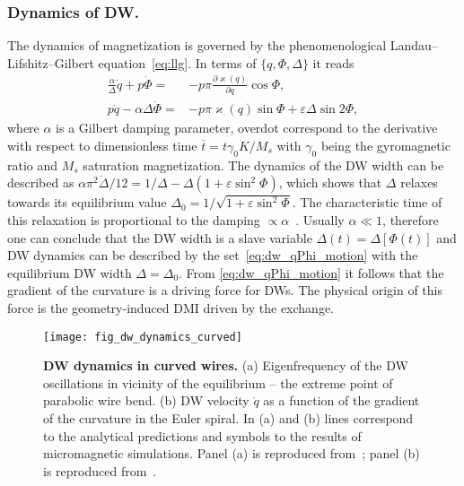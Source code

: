 \subsubsection*{Dynamics of DW.} The dynamics of magnetization is governed by the phenomenological Landau--Lifshitz--Gilbert equation~\eqref{eq:llg}. In terms of $\{q,\Phi,\Delta\}$ it reads~\cite{Yershov15b,Yershov18a}
\begin{equation}\label{eq:dw_qPhi_motion}
\begin{split}
\frac{\alpha}{\Delta}\dot{q}+p\dot{\Phi} = &-p\pi\frac{\partial\varkappa(q)}{\partial q}\cos\Phi,\\
p\dot{q}-\alpha\Delta\dot{\Phi} = &-p\pi\varkappa(q)\sin\Phi+\varepsilon\Delta\sin 2\Phi,
\end{split}
\end{equation}
where $\alpha$ is a Gilbert damping parameter, overdot correspond to the derivative with respect to dimensionless time $\overline{t}=t\gamma_0K/M_s$ with $\gamma_0$ being the gyromagnetic ratio and $M_s$ saturation magnetization.
The dynamics of the DW width can be described as $\alpha\pi^2\dot{\Delta}/12=1/\Delta-\Delta\left(1+\varepsilon\sin^2\Phi\right)$, which shows that $\Delta$ relaxes towards its equilibrium value $\Delta_0=1/\sqrt{1+\varepsilon\sin^2\Phi}$. The characteristic time of this relaxation is proportional to the damping $\propto \alpha$~\cite{Hillebrands06}. Usually $\alpha\ll1$, therefore one can conclude that the DW width is a slave variable $\Delta(t) = \Delta[\Phi(t)]$ and DW dynamics can be described by the set~\eqref{eq:dw_qPhi_motion}  with the equilibrium DW width $\Delta=\Delta_0$. From \eqref{eq:dw_qPhi_motion} it follows that the gradient of the curvature is a driving force for DWs. The physical origin of this force is the geometry-induced DMI driven by the exchange.

\begin{figure}[t]
	\texttt{[image: fig\_dw\_dynamics\_curved]}
	\caption{\label{fig:dw_wire_2}%
		\textbf{DW dynamics in curved wires.} (a) Eigenfrequency of the DW oscillations in vicinity of the equilibrium -- the extreme point of parabolic wire bend. (b) DW velocity $\dot{q}$ as a function of the gradient of the curvature in the Euler spiral. In (a) and (b)  lines correspond to the analytical predictions and symbols to the results of micromagnetic simulations. Panel (a) is reproduced from~\cite{Yershov15b}; panel (b) is reproduced from~\cite{Yershov18a}.}
\end{figure}

